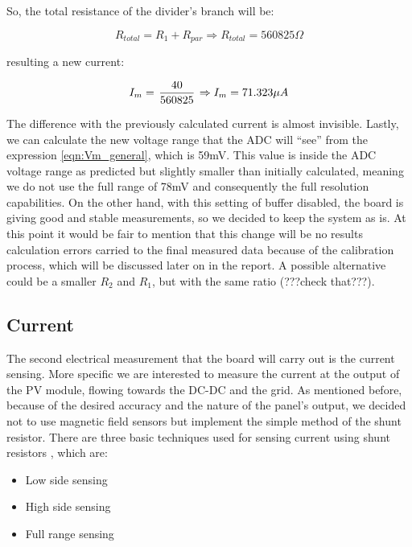 So, the total resistance of the divider's branch will be:

\begin{equation}
R_{total} = R_1 + R_{par} \Rightarrow R_{total} = 560825\Omega
\label{eqn:R_total}
\end{equation}

resulting a new current:

\begin{equation}
I_m = \left. 40 \over 560825 \right. \Rightarrow I_m = 71.323\mu A
\label{eqn:Im_new_calculation}
\end{equation}

The difference with the previously calculated current is almost invisible. Lastly, we can calculate
the new voltage range that the ADC will “see” from the expression \ref{eqn:Vm_general}, which is 59mV. This value is inside the ADC voltage range as predicted but slightly smaller than initially calculated, meaning we do not use the full range of 78mV and consequently the full resolution capabilities. On the other hand, with this setting of buffer disabled, the board is giving good and stable measurements, so we decided to keep the system as is. At this point it would be fair to mention that this change will be no results calculation errors carried to the final measured data because of the calibration process, which will be discussed later on in the report. A possible alternative could be a smaller $R_2$ and $R_1$, but with the same ratio (???check that???).

\subsection{Current}
The second electrical measurement that the board will carry out is the current sensing. More specific we are interested to measure the current at the output of the PV module, flowing towards the DC-DC and the grid. As mentioned before, because of the desired accuracy and the nature of the panel's output, we decided not to use  magnetic field sensors but implement the simple method of the shunt resistor. There are three basic techniques used for sensing current using shunt resistors \cite{current_sense_Linear}, which are:

\begin{itemize}
    \item Low side sensing
    \item High side sensing
    \item Full range sensing
\end{itemize}

